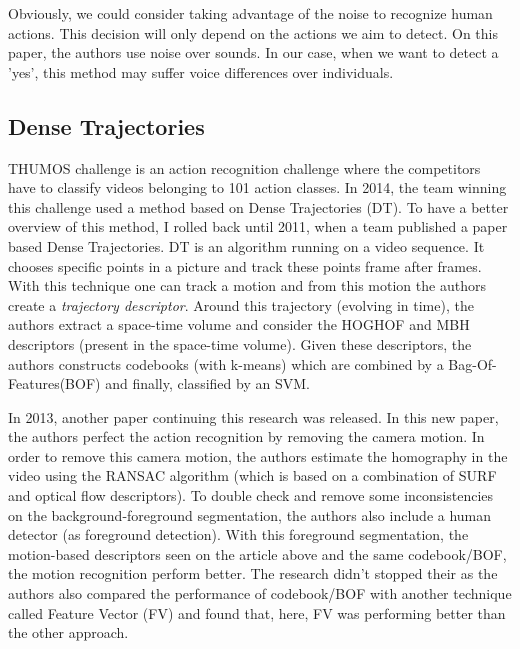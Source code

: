 \documentclass[a4paper]{article}
\begin{document}
			\begin{mdframed}[backgroundcolor = gray!30]
				Obviously, we could consider taking advantage of the noise to recognize human actions. This decision will only depend on the actions we aim to detect. On this paper, the authors use noise over sounds. In our case, when we want to detect a 'yes', this method may suffer voice differences over individuals.
			\end{mdframed}

		\subsection{Dense Trajectories}
		\label{sub:dense_trajectories}
		
			THUMOS challenge\cite{THUMOS14} is an action recognition challenge where the competitors have to classify videos belonging to 101 action classes. In 2014, the team winning this challenge used a method based on Dense Trajectories (DT). To have a better overview of this method, I rolled back until 2011, when a team published a paper based Dense Trajectories\cite{wang2011action}. DT is an algorithm running on a video sequence. It chooses specific points in a picture and track these points frame after frames. With this technique one can track a motion and from this motion the authors create a \textit{trajectory descriptor}. Around this trajectory (evolving in time), the authors extract a space-time volume and consider the HOGHOF and MBH descriptors (present in the space-time volume). Given these descriptors, the authors constructs codebooks (with k-means) which are combined by a Bag-Of-Features(BOF) and finally, classified by an SVM.

			In 2013, another paper continuing this research was released\cite{wang2013action}. In this new paper, the authors perfect the action recognition by removing the camera motion. In order to remove this camera motion, the authors estimate the homography in the video using the RANSAC algorithm (which is based on a combination of SURF and optical flow descriptors). To double check and remove some inconsistencies on the background-foreground segmentation, the authors also include a human detector (as foreground detection). With this foreground segmentation, the motion-based descriptors seen on the article above and the same codebook/BOF, the motion recognition perform better. The research didn't stopped their as the authors also compared the performance of codebook/BOF with another technique called Feature Vector (FV) and found that, here, FV was performing better than the other approach. 
\end{document}
